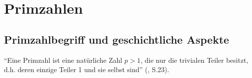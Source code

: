 %
%

\chapter{Primzahlen}

\section{Primzahlbegriff und geschichtliche Aspekte}
\begin{definition}[Primzahl]
``Eine Primzahl ist eine natürliche Zahl $p > 1$, die nur 
die trivialen Teiler besitzt, d.h. deren einzige Teiler
1 und sie selbst sind'' (\cite{schichlsteinbauer}, S.23).
\end{definition}
\vspace{-.5cm}

